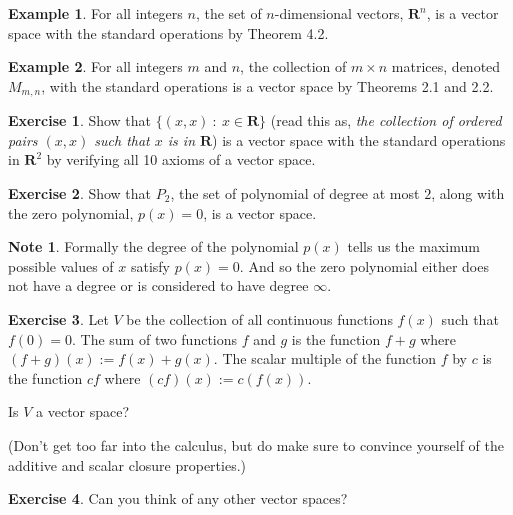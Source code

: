 \documentclass{beamer}
\newcommand{\R}{\mathbf{R}}
\newcommand{\fn}{\insertframenumber}
\theoremstyle{definition}
\newtheorem{exercise}{Exercise}
\newtheorem*{exa}{Example}
\newtheorem*{nb}{Note}
\begin{document}
\begin{frame}{\fn}
	\begin{exa}
		For all integers $n$, the set of $n$-dimensional vectors, $\R^n$, is a vector space with the standard operations by Theorem 4.2.
	\end{exa}
	\begin{exa}
		For all integers $m$ and $n$, the collection of $m\times n$ matrices, denoted $M_{m,n}$, with the standard operations is a vector space by Theorems 2.1 and 2.2.
	\end{exa}
\end{frame}
\begin{frame}{\fn}
	\begin{exercise}
		Show that $\{(x,x)\ :\ x\in \R\}$ (read this as, \textit{the collection of ordered pairs $(x,x)$ such that $x$ is in $\R$}) is a vector space with the standard operations in $\R^2$ by verifying all 10 axioms of a vector space.
	\end{exercise}
	\begin{exercise}
		Show that $P_2$, the set of polynomial of degree at most $2$, along with the zero polynomial, $p(x)=0$, is a vector space.

		\begin{nb}
			Formally the degree of the polynomial $p(x)$ tells us the maximum possible values of $x$ satisfy $p(x)=0$. And so the zero polynomial either does not have a degree or is considered to have degree $\infty$.
		\end{nb}
	\end{exercise}
\end{frame}
\begin{frame}{\fn}
	\begin{exercise}
		Let $V$ be the collection of all continuous functions $f(x)$ such that $f(0)=0$.  The sum of two functions $f$ and $g$ is the function $f+g$ where $(f+g)(x):= f(x)+g(x)$.  The scalar multiple of the function $f$ by $c$ is the function $cf$ where $(cf)(x):= c(f(x))$.
		
		Is $V$ a vector space?  
		
		(Don't get too far into the calculus, but do make sure to convince yourself of the additive and scalar closure properties.)
	\end{exercise}
	\begin{exercise}
		Can you think of any other vector spaces?
	\end{exercise}
\end{frame}
\end{document}
